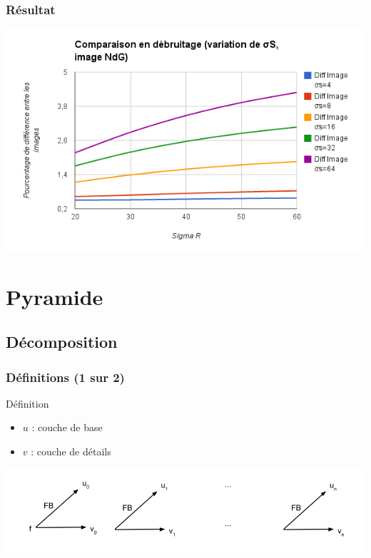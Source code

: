 \documentclass[compress]{beamer}
\begin{document}
\begin{frame}\frametitle{Résultat}

	\centering
	\includegraphics[scale=0.5]{images/debruitageNdGSigmaSDiffImage.png}
\end{frame}


\section{Pyramide}
\subsection{Décomposition}
\begin{frame}\frametitle{Définitions (1 sur 2)}
	\begin{block}{Définition}
		\begin{itemize}
			\item $u$ : couche de base
			\item $v$ : couche de détails
		\end{itemize}
	\end{block}
	\centering
	\includegraphics[scale=0.3]{images/decompo.png}
\end{frame}
\end{document}
